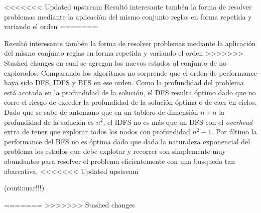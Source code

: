 \documentclass[%
	final,
	reprint,
	notitlepage,
	narroweqnarray,
	inline,
	twoside,
	invited
	]{ieee}
\begin{document}
<<<<<<< Updated upstream
Resultó interesante tambén la forma de resolver problemas mediante la aplicación del mismo conjunto reglas en forma repetida y variando el orden
=======
\par Resultó interesante tambén la forma de resolver problemas mediante la aplicación del mismo conjunto reglas en forma repetida y variando el orden
>>>>>>> Stashed changes
en cual se agregan los nuevos estados al conjunto de no explorados. 
Comparando los algoritmos no sorprende que el orden de performance haya sido DFS, IDFS y BFS en ese orden. Como la profundidad del problema está acotada 
en la profundidad de la solución, el DFS resulta óptimo dado que no corre el riesgo de exceder la profundidad de la solución óptima o de caer 
en ciclos. Dado que se sabe de antemano que en un tablero 
de dimensión $n \times n$ la profundidad de la solución es $n^{2}$, el IDFS no es más que un DFS con el \textit{overhead} extra de tener que explorar 
todos los nodos con profundidad $n^{2} - 1$. Por último la performance del BFS no es óptima dado que dada la naturaleza exponencial del problema los estados 
que debe explotar y recorrer son simplemente muy abundantes para resolver el problema eficientemente con una busqueda tan abarcativa. 
<<<<<<< Updated upstream

(continuar!!!)

=======
>>>>>>> Stashed changes

%
%
%
%
%


\end{document}
